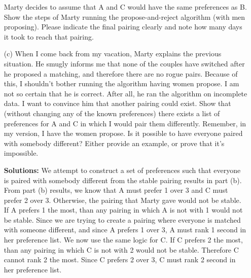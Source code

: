 \documentclass[11pt]{article}
\newif\ifsolutions
\renewcommand{\answer}[1]{{\color{mydarkblue}\textbf{Solutions: }#1}}
\begin{document}
\begin{qunlist}
\begin{itemize}
Marty decides to assume that A and C would have the same preferences as B. 
Show the steps of Marty running the propose-and-reject algorithm (with men proposing). 
Please indicate the final pairing clearly and note how many days it took to reach that pairing.

\ifsolutions
\answer{
\begin{center}
    \begin{tabular}{| l | l | l |}
    \hline
    Days & Women & Proposals \\ \hline
     1 & A & \textcircled{1} 3 \\ 
       & B &  \\ 
       & C & \ 2 \\ \hline
     2 & A & \ 1 \\ 
       & B &  \\ 
       & C & \textcircled{2} 3 \\ \hline
     3 & A & \ 1 \\ 
       & B & \ 3\\ 
       & C & \ 2 \\ \hline
    \end{tabular}
\end{center}
This takes three days, and returns a potentially stable pairing of \{(A,1), (B,3), (C,2)\}.
}
\fi

\newpage
\item[(c)] When I come back from my vacation, Marty explains the previous situation. 
He smugly informs me that none of the couples have switched after he proposed a matching, 
and therefore there are no rogue pairs. 
Because of this, I shouldn't bother running the algorithm having women propose. 
I am not so certain that he is correct. After all, he ran the algorithm on incomplete data. 
I want to convince him that another pairing could exist. 
Show that (without changing any of the known preferences) 
there exists a list of preferences for A and C in which I would pair them differently. 
Remember, in my version, I have the women propose. 
Is it possible to have everyone paired with somebody different? 
Either provide an example, or prove that it's impossible. 

\ifsolutions
\answer{
We attempt to construct a set of preferences such that everyone 
is paired with somebody different from the stable pairing results in part (b).
From part (b) results, we know that A must prefer 1 over 3 and C must prefer 2 over 3. 
Otherwise, the pairing that Marty gave would not be stable. 
If A prefers 1 the most, than any pairing in which A is not with 1 would not be stable. 
Since we are trying to create a pairing where everyone is matched with someone different, 
and since A prefers 1 over 3, A must rank 1 second in her preference list. 
We now use the same logic for C. 
If C prefers 2 the most, than any pairing in which C is not with 2 would not be stable. 
Therefore C cannot rank 2 the most. 
Since C prefers 2 over 3, C must rank 2 second in her preference list.

}
\end{itemize}
\end{qunlist}
\end{document}
